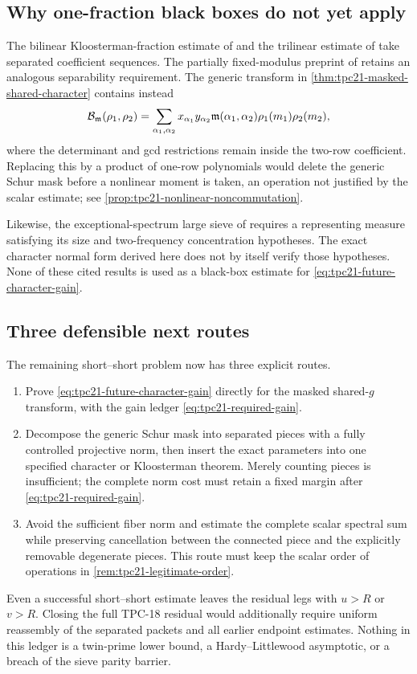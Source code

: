 \subsection{Why one-fraction black boxes do not yet apply}

The bilinear Kloosterman-fraction estimate of
\citet{DukeFriedlanderIwaniec1997} and the trilinear estimate of
\citet{BettinChandee2018} take separated coefficient sequences.  The
partially fixed-modulus preprint of \citet{Wright2026} retains an
analogous separability requirement.  The generic transform in
\cref{thm:tpc21-masked-shared-character} contains instead
\[
 \mathcal B_{\mathfrak m}(\rho_1,\rho_2)
 =\sum_{\alpha_1,\alpha_2}
 x_{\alpha_1}y_{\alpha_2}
 \mathfrak m(\alpha_1,\alpha_2)
 \rho_1(m_1)\rho_2(m_2),
\]
where the determinant and gcd restrictions remain inside the two-row
coefficient.  Replacing this by a product of one-row polynomials would
delete the generic Schur mask before a nonlinear moment is taken, an
operation not justified by the scalar estimate; see
\cref{prop:tpc21-nonlinear-noncommutation}.

Likewise, the exceptional-spectrum large sieve of
\citet{Pascadi2026LargeSieve} requires a representing measure satisfying
its size and two-frequency concentration hypotheses.  The exact
character normal form derived here does not by itself verify those
hypotheses.  None of these cited results is used as a black-box estimate
for \eqref{eq:tpc21-future-character-gain}.

\subsection{Three defensible next routes}

The remaining short--short problem now has three explicit routes.

\begin{enumerate}[label=\textup{(\roman*)}]
 \item Prove \eqref{eq:tpc21-future-character-gain} directly for the
 masked shared-\(g\) transform, with the gain ledger
 \eqref{eq:tpc21-required-gain}.
 \item Decompose the generic Schur mask into separated pieces with a
 fully controlled projective norm, then insert the exact parameters
 into one specified character or Kloosterman theorem.  Merely counting
 pieces is insufficient; the complete norm cost must retain a fixed
 margin after \eqref{eq:tpc21-required-gain}.
 \item Avoid the sufficient fiber norm and estimate the complete scalar
 spectral sum while preserving cancellation between the connected
 piece and the explicitly removable degenerate pieces.  This route must
 keep the scalar order of operations in
 \cref{rem:tpc21-legitimate-order}.
\end{enumerate}

Even a successful short--short estimate leaves the residual legs with
\(u>R\) or \(v>R\).  Closing the full TPC-18 residual would additionally
require uniform reassembly of the separated packets and all earlier
endpoint estimates.  Nothing in this ledger is a twin-prime lower bound, a
Hardy--Littlewood asymptotic, or a breach of the sieve parity barrier.
